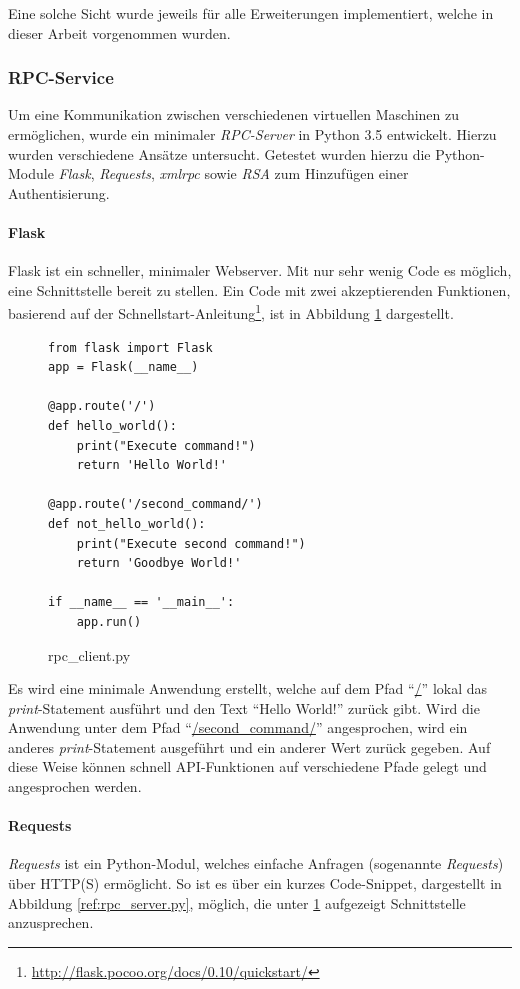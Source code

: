 Eine solche Sicht wurde jeweils für alle Erweiterungen implementiert, welche in dieser Arbeit vorgenommen wurden.

\newpage
\subsubsection{RPC-Service}\label{ref:XMLRPC}
Um eine Kommunikation zwischen verschiedenen virtuellen Maschinen zu ermöglichen, wurde ein minimaler \textit{RPC-Server} in Python 3.5 entwickelt. Hierzu wurden verschiedene Ansätze untersucht. Getestet wurden hierzu die Python-Module \textit{Flask}, \textit{Requests}, \textit{xmlrpc} sowie \textit{RSA} zum Hinzufügen einer Authentisierung.

\paragraph{Flask}\label{ref:flask}
Flask ist ein schneller, minimaler Webserver. Mit nur sehr wenig Code es möglich, eine Schnittstelle bereit zu stellen. Ein Code mit zwei akzeptierenden Funktionen, basierend auf der Schnellstart-Anleitung\footnote{\url{http://flask.pocoo.org/docs/0.10/quickstart/}}, ist in Abbildung \ref{ref:rpc_client.py} dargestellt.\\

\begin{figure}
\begin{lstlisting}
from flask import Flask
app = Flask(__name__)

@app.route('/')
def hello_world():
	print("Execute command!")
    return 'Hello World!'
    
@app.route('/second_command/')
def not_hello_world():
	print("Execute second command!")
    return 'Goodbye World!'

if __name__ == '__main__':
    app.run()
\end{lstlisting}
\caption{rpc\_client.py}
\label{ref:rpc_client.py}
\end{figure}

Es wird eine minimale Anwendung erstellt, welche auf dem Pfad "`\url{/}"' lokal das \textit{print}-Statement ausführt und den Text "`Hello World!"' zurück gibt. Wird die Anwendung unter dem Pfad "`\url{/second_command/}"' angesprochen, wird ein anderes \textit{print}-Statement ausgeführt und ein anderer Wert zurück gegeben. Auf diese Weise können schnell API-Funktionen auf verschiedene Pfade gelegt und angesprochen werden.

\newpage
\paragraph{Requests}
\textit{Requests} ist ein Python-Modul, welches einfache Anfragen (sogenannte \textit{Requests}) über HTTP(S) ermöglicht. So ist es über ein kurzes Code-Snippet, dargestellt in Abbildung \ref{ref:rpc_server.py}, möglich, die unter \ref{ref:rpc_client.py} aufgezeigt Schnittstelle anzusprechen.\\

